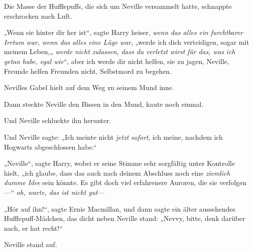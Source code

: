 Die Masse der Hufflepuffs, die sich um Neville versammelt hatte, schnappte erschrocken nach Luft.

„Wenn sie hinter dir her ist“, sagte Harry heiser, \emph{wenn das alles ein furchtbarer Irrtum war, wenn das alles eine Lüge war}, „werde ich dich verteidigen, sogar mit meinem Leben,„ \emph{werde nicht zulassen, dass du verletzt wirst für das, was ich getan habe, egal wie}“, aber ich werde dir nicht helfen, sie zu jagen, Neville, Freunde helfen Freunden nicht, Selbstmord zu begehen.

Nevilles Gabel hielt auf dem Weg zu seinem Mund inne.

Dann steckte Neville den Bissen in den Mund, kaute noch einmal.

Und Neville schluckte ihn herunter.

Und Neville sagte: „Ich meinte nicht \emph{jetzt sofort}, ich meine, nachdem ich Hogwarts abgeschlossen habe.“

„Neville“, sagte Harry, wobei er seine Stimme sehr sorgfältig unter Kontrolle hielt, „ich glaube, dass das auch nach deinem Abschluss noch eine \emph{ziemlich dumme} \emph{Idee} sein könnte. Es gibt doch viel erfahrenere Auroren, die sie verfolgen—“ \emph{oh, warte, das ist nicht gut}—

„Hör auf ihn!“, sagte Ernie Macmillan, und dann sagte ein älter aussehendes Hufflepuff-Mädchen, das dicht neben Neville stand: „Nevvy, bitte, denk darüber nach, er hat recht!“

Neville stand auf.

